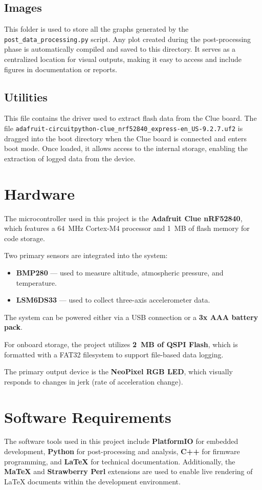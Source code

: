 \documentclass[12pt]{report}
\begin{document}
\section{Images}

This folder is used to store all the graphs generated by the \texttt{post\_data\_processing.py} script. Any plot created during the post-processing phase is automatically compiled and saved to this directory. It serves as a centralized location for visual outputs, making it easy to access and include figures in documentation or reports.

\section{Utilities}
This file contains the driver used to extract flash data from the Clue board. The file \texttt{adafruit-circuitpython-clue\_nrf52840\_express-en\_US-9.2.7.uf2} is dragged into the boot directory when the Clue board is connected and enters boot mode. Once loaded, it allows access to the internal storage, enabling the extraction of logged data from the device.

\chapter{Hardware}
The microcontroller used in this project is the \textbf{Adafruit Clue nRF52840}, which features a 64~MHz Cortex-M4 processor and 1~MB of flash memory for code storage.

Two primary sensors are integrated into the system:
\begin{itemize}
    \item \textbf{BMP280} — used to measure altitude, atmospheric pressure, and temperature.
    \item \textbf{LSM6DS33} — used to collect three-axis accelerometer data.
\end{itemize}

The system can be powered either via a USB connection or a \textbf{3x AAA battery pack}.

For onboard storage, the project utilizes \textbf{2~MB of QSPI Flash}, which is formatted with a FAT32 filesystem to support file-based data logging.

The primary output device is the \textbf{NeoPixel RGB LED}, which visually responds to changes in jerk (rate of acceleration change).

\chapter{Software Requirements}
The software tools used in this project include \textbf{PlatformIO} for embedded development, \textbf{Python} for post-processing and analysis, \textbf{C++} for firmware programming, and \textbf{LaTeX} for technical documentation. Additionally, the \textbf{MaTeX} and \textbf{Strawberry Perl} extensions are used to enable live rendering of LaTeX documents within the development environment.
\end{document}
